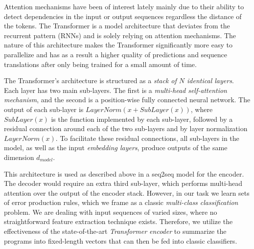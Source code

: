 Attention mechanisms have been of interest lately \citep{Bahdanau2015, Kim2017,
Vaswani_2017} mainly due to their ability to detect dependencies in the input or
output sequences regardless the distance of the tokens. The Transformer is a
model architecture that deviates from the recurrent pattern (\eg RNNs) and is
solely relying on attention mechanisms. The nature of this architecture makes
the Transformer significantly more easy to parallelize and has as a result a
higher quality of predictions and sequence translations after only being trained
for a small amount of time.

The Transformer's architecture is structured as a \emph{stack of $N$ identical
layers}. Each layer has two main sub-layers. The first is a \emph{multi-head
self-attention mechanism}, and the second is a position-wise fully connected
neural network. The output of each sub-layer is $LayerNorm(x + SubLayer(x))$,
where $SubLayer(x)$ is the function implemented by each sub-layer, followed by a
residual connection around each of the two sub-layers and  by layer
normalization $LayerNorm(x)$. To facilitate these residual connections, all
sub-layers in the model, as well as the input \emph{embedding layers}, produce
outputs of the same dimension $d_{model}$.

This architecture is used as described above in a seq2seq model
\citep{Vaswani_2017} for the encoder. The decoder would require an extra third
sub-layer, which performs multi-head attention over the output of the encoder
stack. However, in our task we learn sets of error production rules, which we
frame as a classic \emph{multi-class classification} problem. We are dealing
with input sequences of varied sizes, where no straightforward feature
extraction technique exists. Therefore, we utilize the effectiveness of the
state-of-the-art \emph{Transformer encoder} to summarize the programs into
fixed-length vectors that can then be fed into classic \dnn{} classifiers.



